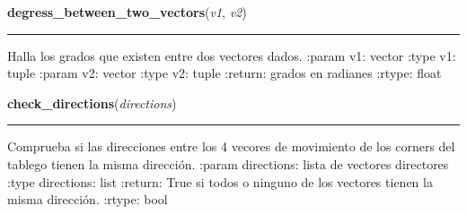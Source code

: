     \vspace{0.5ex}

\hspace{.8\funcindent}\begin{boxedminipage}{\funcwidth}

    \raggedright \textbf{degress\_between\_two\_vectors}(\textit{v1}, \textit{v2})

    \vspace{-1.5ex}

    \rule{\textwidth}{0.5\fboxrule}
\setlength{\parskip}{2ex}
    Halla los grados que existen entre dos vectores dados. :param v1: 
    vector :type v1: tuple :param v2: vector :type v2: tuple :return: 
    grados en radianes :rtype: float

\setlength{\parskip}{1ex}
    \end{boxedminipage}

    \label{src:check_goban_moved:check_directions}

    \vspace{0.5ex}

\hspace{.8\funcindent}\begin{boxedminipage}{\funcwidth}

    \raggedright \textbf{check\_directions}(\textit{directions})

    \vspace{-1.5ex}

    \rule{\textwidth}{0.5\fboxrule}
\setlength{\parskip}{2ex}
    Comprueba si las direcciones entre los 4 vecores de movimiento de los 
    corners del tablego tienen la misma dirección. :param directions: lista
    de vectores directores :type directions: list :return: True si todos o 
    ninguno de los vectores tienen la misma dirección. :rtype: bool

\setlength{\parskip}{1ex}
    \end{boxedminipage}

    \label{src:check_goban_moved:check_goban_moved}

    \vspace{0.5ex}


